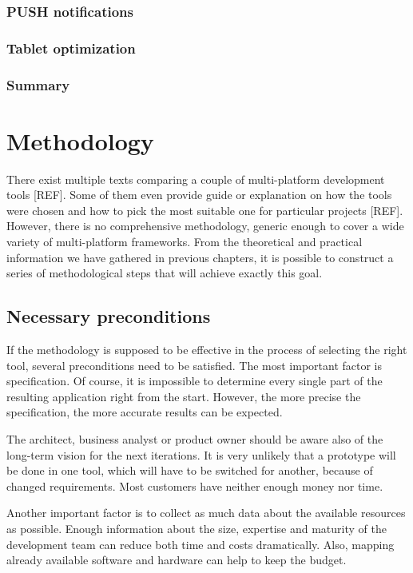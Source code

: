 \documentclass[english,master,public,dept460,male,cpdeclaration,oneside]{diploma}
\begin{document}
\subsubsection{PUSH notifications}

\subsubsection{Tablet optimization}

\subsubsection{Summary}



\section{Methodology}

There exist multiple texts comparing a couple of multi-platform development tools [REF]. Some of them even provide guide or explanation on how the tools were chosen and how to pick the most suitable one for particular projects [REF]. However, there is no comprehensive methodology, generic enough to cover a wide variety of multi-platform frameworks. From the theoretical and practical information we have gathered in previous chapters, it is possible to construct a series of methodological steps that will achieve exactly this goal.

\subsection{Necessary preconditions}
If the methodology is supposed to be effective in the process of selecting the right tool, several preconditions need to be satisfied. The most important factor is specification. Of course, it is impossible to determine every single part of the resulting application right from the start. However, the more precise the specification, the more accurate results can be expected. 

The architect, business analyst or product owner should be aware also of the long-term vision for the next iterations. It is very unlikely that a prototype will be done in one tool, which will have to be switched for another, because of changed requirements. Most customers have neither enough money nor time.

Another important factor is to collect as much data about the available resources as possible. Enough information about the size, expertise and maturity of the development team can reduce both time and costs dramatically. Also, mapping already available software and hardware can help to keep the budget.
\end{document}

